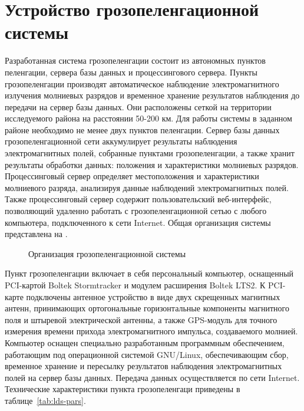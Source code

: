 \section{Устройство грозопеленгационной системы}
\label{sec:lds-inside}
Разработанная система грозопеленгации состоит из автономных пунктов пеленгации, сервера базы данных и процессингового сервера. Пункты грозопеленгации производят автоматическое наблюдение электромагнитного излучения молниевых разрядов и временное хранение результатов наблюдения до передачи на сервер базы данных. Они расположены сеткой на территории исследуемого района на расстоянии 50-200 км. Для работы системы в заданном районе необходимо не менее двух пунктов пеленгации. Сервер базы данных грозопеленгационной сети аккумулирует результаты наблюдения электромагнитных полей, собранные пунктами грозопеленгации, а также хранит результаты обработки данных: положения и характеристики молниевых разрядов. Процессинговый сервер определяет местоположения и характеристики молниевого разряда, анализируя данные наблюдений электромагнитных полей. Также процессинговый сервер содержит пользовательский веб-интерфейс, позволяющий удаленно работать с грозопеленгационной сетью с любого компьютера, подключенного к сети Internet. Общая организация системы представлена на .

\begin{figure}[h]
	\caption{Организация грозопеленгационной системы}
	\label{fig:lds-schematic}
\end{figure}

Пункт грозопеленгации включает в себя персональный компьютер, оснащенный PCI-картой Boltek Stormtracker и модулем расширения Boltek LTS2. К PCI-карте подключены антенное устройство в виде двух скрещенных магнитных антенн, принимающих ортогональные горизонтальные компоненты магнитного поля и штыревой электрической антенны, а также GPS-модуль для точного измерения времени прихода электромагнитного импульса, создаваемого молнией. Компьютер оснащен специально разработанным программным обеспечением, работающим под операционной системой GNU/Linux, обеспечивающим сбор, временное хранение и пересылку результатов наблюдения электромагнитных полей на сервер базы данных. Передача данных осуществляется по сети Internet. Технические характеристики пункта грозопеленгаци приведены в таблице~\ref{tab:lds-pars}.

